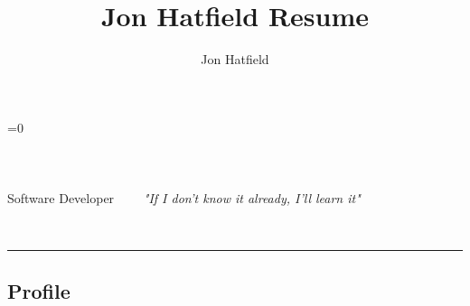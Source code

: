 \documentclass[10pt,letterpaper]{article}
\author{Jon Hatfield}
\title{Jon Hatfield Resume}
\begin{document}
\begin{center}
    {\huge \textbf{}}


        \ifnum{}=0
             \ \textbullet \ \ 
            \\
            \\
        \else
            \ \textbullet \ \  
            \\
            \ \textbullet \ \ %
            \\
        \fi
    {\large Software Developer \ \ \textbullet \ \ \emph{"If I don't know it already, I'll learn it"}}
\end{center}


\\

\hrule
\vspace{-0.4em}
\subsection*{Profile}
\end{document}

